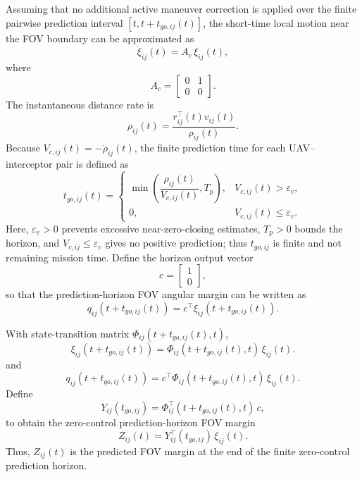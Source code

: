\documentclass{cja}
\begin{document}
Assuming that no additional active maneuver correction is applied over the finite pairwise prediction interval $[t,t+t_{go,ij}(t)]$, the short-time local motion near the FOV boundary can be approximated as
\begin{equation}
\dot \xi_{ij}(t)
=
A_{c}\,\xi_{ij}(t),
\end{equation}
where
\begin{equation}
A_{c}
=
\begin{bmatrix}
0 & 1\\
0 & 0
\end{bmatrix}.
\end{equation}
The instantaneous distance rate is
\begin{equation}
\dot\rho_{ij}(t)
=
\frac{r_{ij}^{\top}(t)v_{ij}(t)}{\rho_{ij}(t)}.
\end{equation}
Because $V_{c,ij}(t)=-\dot\rho_{ij}(t)$, the finite prediction time for each UAV--interceptor pair is defined as
\begin{equation}
t_{go,ij}(t)
=
\begin{cases}
\displaystyle
\min\!\left(
\dfrac{\rho_{ij}(t)}{V_{c,ij}(t)},
T_p
\right),
& V_{c,ij}(t)>\varepsilon_v,\\[3mm]
0,
& V_{c,ij}(t)\le\varepsilon_v.
\end{cases}
\end{equation}
Here, $\varepsilon_v>0$ prevents excessive near-zero-closing estimates, $T_p>0$ bounds the horizon, and $V_{c,ij}\le\varepsilon_v$ gives no positive prediction; thus $t_{go,ij}$ is finite and not remaining mission time. Define the horizon output vector
\begin{equation}
c=
\begin{bmatrix}
1\\
0
\end{bmatrix},
\end{equation}
so that the prediction-horizon FOV angular margin can be written as
\begin{equation}
q_{ij}\!\left(t+t_{go,ij}(t)\right)=c^{\top}\xi_{ij}\!\left(t+t_{go,ij}(t)\right).
\end{equation}

With state-transition matrix $\Phi_{ij}(t+t_{go,ij}(t),t)$,
\begin{equation}
\xi_{ij}\!\left(t+t_{go,ij}(t)\right)=\Phi_{ij}\!\left(t+t_{go,ij}(t),t\right)\,\xi_{ij}(t).
\end{equation}
and
\begin{equation}
q_{ij}\!\left(t+t_{go,ij}(t)\right)=c^{\top}\Phi_{ij}\!\left(t+t_{go,ij}(t),t\right)\,\xi_{ij}(t).
\end{equation}
Define
\begin{equation}
Y_{ij}(t_{go,ij})=\Phi_{ij}^{\top}\!\left(t+t_{go,ij}(t),t\right)\,c,
\end{equation}
to obtain the zero-control prediction-horizon FOV margin
\begin{equation}
Z_{ij}(t)=Y_{ij}^{\top}(t_{go,ij})\,\xi_{ij}(t).
\end{equation}
Thus, $Z_{ij}(t)$ is the predicted FOV margin at the end of the finite zero-control prediction horizon.
\end{document}
